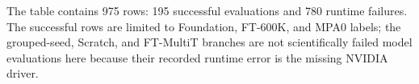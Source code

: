 The table contains 975 rows: 195 successful evaluations and 780 runtime failures. The successful rows are limited to Foundation, FT-600K, and MPA0 labels; the grouped-seed, Scratch, and FT-MultiT branches are not scientifically failed model evaluations here because their recorded runtime error is the missing NVIDIA driver.
